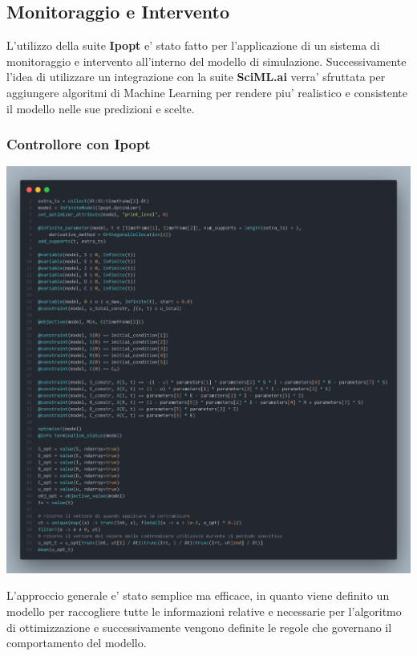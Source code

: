 \subsection{Monitoraggio e Intervento}
L'utilizzo della suite \textbf{Ipopt} e' stato fatto per l'applicazione di un sistema
di monitoraggio e intervento all'interno del modello di simulazione. Successivamente l'idea
di utilizzare un integrazione con la suite \textbf{SciML.ai} verra' sfruttata per 
aggiungere algoritmi di Machine Learning per rendere piu' realistico e consistente il modello 
nelle sue predizioni e scelte.

\subsubsection{Controllore con Ipopt}

\begin{minipage}{\linewidth}
	\centering
	\includegraphics[width=\textwidth]{img/controller_ipopt.png}
	\label{fig:controller_ipopt}
\end{minipage}

L'approccio generale e' stato semplice ma efficace, in quanto viene definito un modello 
per raccogliere tutte le informazioni relative e necessarie per l'algoritmo di ottimizzazione
e successivamente vengono definite le regole che governano il comportamento del modello. 

